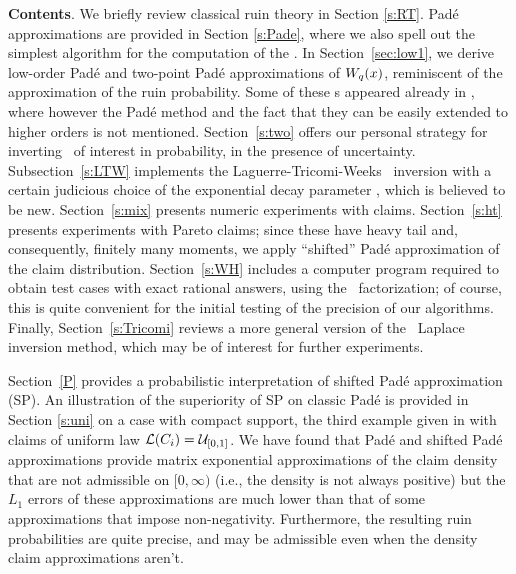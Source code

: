 
{\bf Contents}. We briefly review  classical ruin theory in Section \ref{s:RT}. Pad\'e approximations are provided  in Section \ref{s:Pade}, where we also
    spell out  the simplest algorithm for the  computation of the \sf. %
In Section~\ref{sec:low1}, we derive  low-order Pad\'e and two-point Pad\'e approximations of $W_q(x)$, reminiscent
   of the  \deV approximation of the ruin probability. Some of these \app s  appeared already in \cite{gerber2008methods}, where however the Pad\'e method and the fact that they can be easily extended to higher orders is not mentioned.
  Section~\ref{s:two} offers our personal strategy for inverting \LTs \ of interest in probability, in the presence of uncertainty.
 Subsection~\ref{s:LTW} implements the Laguerre-Tricomi-Weeks \LT \ inversion  with a certain judicious choice of the exponential decay parameter , which is believed to be new.  Section~\ref{s:mix} presents numeric experiments
   with \mix claims.
   Section~\ref{s:ht} presents experiments
   with Pareto claims; since these have heavy tail and, consequently, finitely many
    moments, we apply ``shifted'' Pad\'e approximation of the claim distribution.
   Section~\ref{s:WH} includes a computer program required to obtain test cases with exact rational answers, using the \WH \ factorization; of course, this is quite convenient for the initial testing  of the precision of our algorithms.
   Finally, Section~\ref{s:Tricomi} reviews a more general version of the \LTW \ Laplace inversion method, which may be of interest for further experiments.
\iffalse The subordinator risk model  perturbed by Brownian motion
 is introduced in section \ref{s:soph} -- see \eqr{eq:per} for  the two  formulas for ruin \pros (by creeping and by jump).
 \fi


\iffalse
Section~\ref{P} provides a probabilistic interpretation of shifted Pad\'e approximation (SP).  An illustration
of the superiority of SP on classic Pad\'e is provided in Section \ref{s:uni} on  a case with compact
support, the third example given in \cite{gzyl2013determination}
with claims of uniform law ${\mathcal L}(C_i)={\mathcal U}_{[0,1]}$.  We have found that
Pad\'e and shifted Pad\'e approximations provide matrix exponential
approximations of the claim density that are not admissible on $[0,\infty)$
(i.e., the density is not always positive) but the $L_1$ errors of these
approximations are much lower than that of some approximations that impose
non-negativity. Furthermore, the resulting ruin probabilities are quite precise, and may be  admissible even when the density claim approximations aren't.


